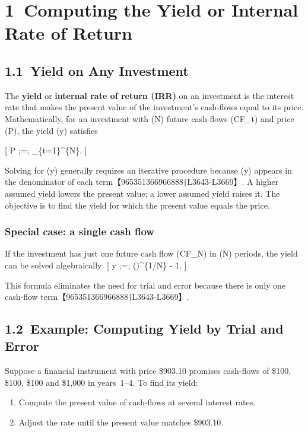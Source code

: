 \documentclass[
  letterpaper,
  DIV=11,
  numbers=noendperiod]{scrartcl}
\providecommand{\tightlist}{%
  \setlength{\itemsep}{0pt}\setlength{\parskip}{0pt}}
\begin{document}
\section{1~Computing the Yield or Internal Rate of
Return}\label{computing-the-yield-or-internal-rate-of-return}

\subsection{1.1~Yield on Any Investment}\label{yield-on-any-investment}

The \textbf{yield} or \textbf{internal rate of return (IRR)} on an
investment is the interest rate that makes the present value of the
investment's cash‑flows equal to its price. Mathematically, for an
investment with (N) future cash‑flows (CF\_t) and price (P), the yield
(y) satisfies

{[} P ;=; \sum\_\{t=1\}\^{}\{N\}. {]}

Solving for (y) generally requires an iterative procedure because (y)
appears in the denominator of each term【965351366966888†L3643-L3669】.
A higher assumed yield lowers the present value; a lower assumed yield
raises it. The objective is to find the yield for which the present
value equals the price.

\subsubsection{Special case: a single cash
flow}\label{special-case-a-single-cash-flow}

If the investment has just one future cash flow (CF\_N) in (N) periods,
the yield can be solved algebraically: {[} y ;=;
\left(\right)\^{}\{1/N\} - 1. {]}

This formula eliminates the need for trial and error because there is
only one cash‑flow term【965351366966888†L3643-L3669】.

\subsection{1.2~Example: Computing Yield by Trial and
Error}\label{example-computing-yield-by-trial-and-error}

Suppose a financial instrument with price \$903.10 promises cash‑flows
of \$100, \$100, \$100 and \$1,000 in years~1--4. To find its yield:

\begin{enumerate}
\def\labelenumi{\arabic{enumi}.}
\tightlist
\item
  Compute the present value of cash‑flows at several interest rates.
\item
  Adjust the rate until the present value matches \$903.10.
\end{enumerate}
\end{document}
